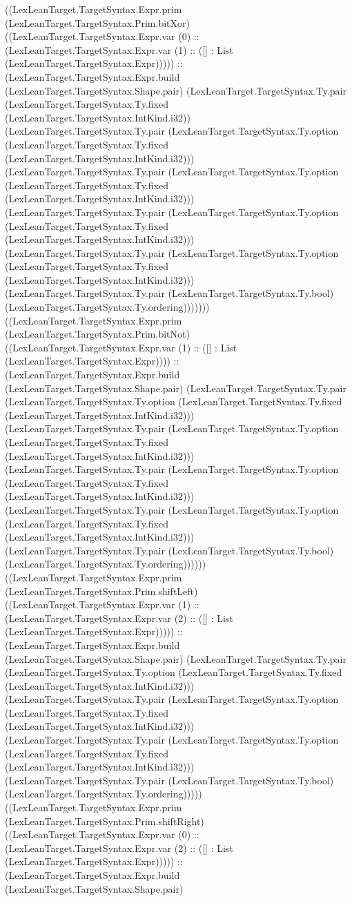 \documentclass[11pt]{article}
\begin{document}
((LexLeanTarget.TargetSyntax.Expr.prim (LexLeanTarget.TargetSyntax.Prim.bitXor) ((LexLeanTarget.TargetSyntax.Expr.var (0) :: (LexLeanTarget.TargetSyntax.Expr.var (1) :: ([] : List (LexLeanTarget.TargetSyntax.Expr))))) :: (LexLeanTarget.TargetSyntax.Expr.build (LexLeanTarget.TargetSyntax.Shape.pair) (LexLeanTarget.TargetSyntax.Ty.pair (LexLeanTarget.TargetSyntax.Ty.fixed (LexLeanTarget.TargetSyntax.IntKind.i32)) (LexLeanTarget.TargetSyntax.Ty.pair (LexLeanTarget.TargetSyntax.Ty.option (LexLeanTarget.TargetSyntax.Ty.fixed (LexLeanTarget.TargetSyntax.IntKind.i32))) (LexLeanTarget.TargetSyntax.Ty.pair (LexLeanTarget.TargetSyntax.Ty.option (LexLeanTarget.TargetSyntax.Ty.fixed (LexLeanTarget.TargetSyntax.IntKind.i32))) (LexLeanTarget.TargetSyntax.Ty.pair (LexLeanTarget.TargetSyntax.Ty.option (LexLeanTarget.TargetSyntax.Ty.fixed (LexLeanTarget.TargetSyntax.IntKind.i32))) (LexLeanTarget.TargetSyntax.Ty.pair (LexLeanTarget.TargetSyntax.Ty.option (LexLeanTarget.TargetSyntax.Ty.fixed (LexLeanTarget.TargetSyntax.IntKind.i32))) (LexLeanTarget.TargetSyntax.Ty.pair (LexLeanTarget.TargetSyntax.Ty.bool) (LexLeanTarget.TargetSyntax.Ty.ordering))))))) ((LexLeanTarget.TargetSyntax.Expr.prim (LexLeanTarget.TargetSyntax.Prim.bitNot) ((LexLeanTarget.TargetSyntax.Expr.var (1) :: ([] : List (LexLeanTarget.TargetSyntax.Expr)))) :: (LexLeanTarget.TargetSyntax.Expr.build (LexLeanTarget.TargetSyntax.Shape.pair) (LexLeanTarget.TargetSyntax.Ty.pair (LexLeanTarget.TargetSyntax.Ty.option (LexLeanTarget.TargetSyntax.Ty.fixed (LexLeanTarget.TargetSyntax.IntKind.i32))) (LexLeanTarget.TargetSyntax.Ty.pair (LexLeanTarget.TargetSyntax.Ty.option (LexLeanTarget.TargetSyntax.Ty.fixed (LexLeanTarget.TargetSyntax.IntKind.i32))) (LexLeanTarget.TargetSyntax.Ty.pair (LexLeanTarget.TargetSyntax.Ty.option (LexLeanTarget.TargetSyntax.Ty.fixed (LexLeanTarget.TargetSyntax.IntKind.i32))) (LexLeanTarget.TargetSyntax.Ty.pair (LexLeanTarget.TargetSyntax.Ty.option (LexLeanTarget.TargetSyntax.Ty.fixed (LexLeanTarget.TargetSyntax.IntKind.i32))) (LexLeanTarget.TargetSyntax.Ty.pair (LexLeanTarget.TargetSyntax.Ty.bool) (LexLeanTarget.TargetSyntax.Ty.ordering)))))) ((LexLeanTarget.TargetSyntax.Expr.prim (LexLeanTarget.TargetSyntax.Prim.shiftLeft) ((LexLeanTarget.TargetSyntax.Expr.var (1) :: (LexLeanTarget.TargetSyntax.Expr.var (2) :: ([] : List (LexLeanTarget.TargetSyntax.Expr))))) :: (LexLeanTarget.TargetSyntax.Expr.build (LexLeanTarget.TargetSyntax.Shape.pair) (LexLeanTarget.TargetSyntax.Ty.pair (LexLeanTarget.TargetSyntax.Ty.option (LexLeanTarget.TargetSyntax.Ty.fixed (LexLeanTarget.TargetSyntax.IntKind.i32))) (LexLeanTarget.TargetSyntax.Ty.pair (LexLeanTarget.TargetSyntax.Ty.option (LexLeanTarget.TargetSyntax.Ty.fixed (LexLeanTarget.TargetSyntax.IntKind.i32))) (LexLeanTarget.TargetSyntax.Ty.pair (LexLeanTarget.TargetSyntax.Ty.option (LexLeanTarget.TargetSyntax.Ty.fixed (LexLeanTarget.TargetSyntax.IntKind.i32))) (LexLeanTarget.TargetSyntax.Ty.pair (LexLeanTarget.TargetSyntax.Ty.bool) (LexLeanTarget.TargetSyntax.Ty.ordering))))) ((LexLeanTarget.TargetSyntax.Expr.prim (LexLeanTarget.TargetSyntax.Prim.shiftRight) ((LexLeanTarget.TargetSyntax.Expr.var (0) :: (LexLeanTarget.TargetSyntax.Expr.var (2) :: ([] : List (LexLeanTarget.TargetSyntax.Expr))))) :: (LexLeanTarget.TargetSyntax.Expr.build (LexLeanTarget.TargetSyntax.Shape.pair) 
\end{document}
